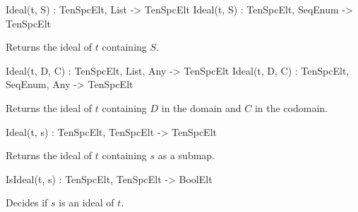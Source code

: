 \begin{intrinsics}
Ideal(t, S) : TenSpcElt, List -> TenSpcElt
Ideal(t, S) : TenSpcElt, SeqEnum -> TenSpcElt
\end{intrinsics}

Returns the ideal of $t$ containing $S$.

\begin{intrinsics}
Ideal(t, D, C) : TenSpcElt, List, Any -> TenSpcElt
Ideal(t, D, C) : TenSpcElt, SeqEnum, Any -> TenSpcElt
\end{intrinsics}

Returns the ideal of $t$ containing $D$ in the domain and $C$ in the codomain.

\begin{intrinsics}
Ideal(t, s) : TenSpcElt, TenSpcElt -> TenSpcElt
\end{intrinsics}

Returns the ideal of $t$ containing $s$ as a submap.

\begin{intrinsics}
IsIdeal(t, s) : TenSpcElt, TenSpcElt -> BoolElt
\end{intrinsics}

Decides if $s$ is an ideal of $t$.


